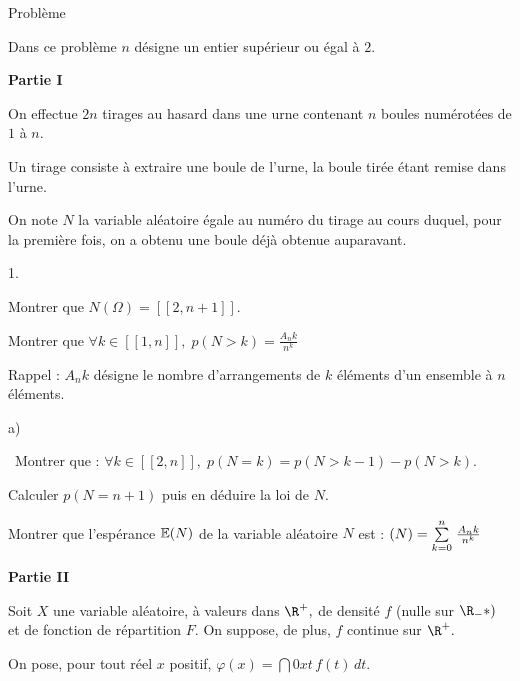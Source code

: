 \documentclass[11pt]{article}%
\begin{document}
{\Large Problème}

Dans ce problème $n$ désigne un entier supérieur ou égal 
à $2$.

\textbf{Partie I}

On effectue $2n$ tirages au hasard dans une urne contenant $n$ boules
numérotées de $1$ à $n$.

Un tirage consiste à extraire une boule de l'urne, la boule tirée 
étant remise dans l'urne.

On note $N$ la variable aléatoire égale au numéro du tirage au
cours duquel, pour la première fois, on a obtenu une boule déjà
obtenue auparavant.

\begin{noliste}{1.}
 \setlength{\itemsep}{4mm}
\item {Montrer que $N(\Omega ) = [[2,n + 1]]$. }

\item {Montrer que $\forall k\in [[1,n]],\;p\left( N>k\right) =
\frac{A_{n}{k}}{n^{k}}$ }

\hspace{-1cm}Rappel : $A_{n}{k}$ désigne le nombre d'arrangements de
$k$
éléments d'un ensemble à $n$ éléments.

\item 
\begin{noliste}{a)}
 \setlength{\itemsep}{2mm}
\item {\ Montrer que : }$\forall k${$\in [[2,n]],\;p(N = k) =
p(N>k-1)-p(N>k)$. }

\item {Calculer $p(N = n + 1)$ puis en déduire la loi de }$N{.}$
\end{noliste}

\item Montrer que l'espérance $\mathbb{E}(N)$ de la variable {aléatoire} $N$
est : $\left( N\right) = {\textstyle\sum\limits_{k = 0}^{n}}\hspace{.1cm}\frac{A_{n}{k}}{n^{k}}$
\end{noliste}

\textbf{Partie II}

Soit $X$ une variable aléatoire, à valeurs dans $\R^{+},$ de
densité $f$ (nulle sur $\R_{-}{*})$ et de fonction de répartition $F.$
On suppose, de plus, $f$ continue sur $\R^{+}.$

On pose, pour tout réel $x$ positif, $\varphi \left( x\right)
 = \dint{0}{x}t\,f\left( t\right) \,dt$.
\end{document}
